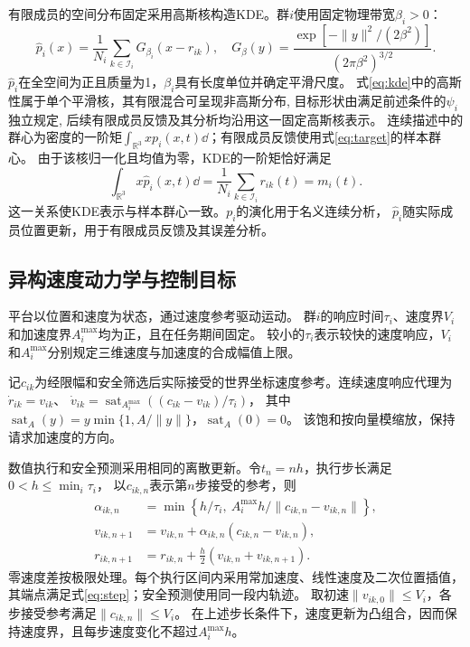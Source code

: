 \documentclass[UTF8,a4paper,11pt,fontset=none]{ctexart}
\newcommand{\R}{\mathbb R}\newcommand{\KL}{\operatorname{KL}}
\begin{document}
有限成员的空间分布固定采用高斯核构造KDE。群$i$使用固定物理带宽$\beta_i>0$：
\begin{equation}
\widehat p_i(x)=\frac1{N_i}\sum_{k\in\mathcal I_i}G_{\beta_i}(x-r_{ik}),\quad
G_\beta(y)=\frac{\exp[-\|y\|^2/(2\beta^2)]}{(2\pi\beta^2)^{3/2}}.
\label{eq:kde}
\end{equation}
$\widehat p_i$在全空间为正且质量为1，$\beta_i$具有长度单位并确定平滑尺度。
式\eqref{eq:kde}中的高斯性属于单个平滑核，其有限混合可呈现非高斯分布,
目标形状由满足前述条件的$\psi_i$独立规定,
后续有限成员反馈及其分析均沿用这一固定高斯核表示。
连续描述中的群心为密度的一阶矩$\int_{\R^3}xp_i(x,t)\dd$；有限成员反馈使用式\eqref{eq:target}的样本群心。
由于该核归一化且均值为零，KDE的一阶矩恰好满足
\[
\int_{\R^3}x\widehat p_i(x,t)\dd
=\frac1{N_i}\sum_{k\in\mathcal I_i}r_{ik}(t)=m_i(t).
\]
这一关系使KDE表示与样本群心一致。$p_i$的演化用于名义连续分析，
$\widehat p_i$随实际成员位置更新，用于有限成员反馈及其误差分析。

\subsection{异构速度动力学与控制目标}
平台以位置和速度为状态，通过速度参考驱动运动。
群$i$的响应时间$\tau_i$、速度界$V_i$和加速度界$A_i^{\max}$均为正，且在任务期间固定。
较小的$\tau_i$表示较快的速度响应，$V_i$和$A_i^{\max}$分别规定三维速度与加速度的合成幅值上限。

记$c_{ik}$为经限幅和安全筛选后实际接受的世界坐标速度参考。连续速度响应代理为
$\dot r_{ik}=v_{ik}$、
$\dot v_{ik}=\operatorname{sat}_{A_i^{\max}}((c_{ik}-v_{ik})/\tau_i)$，
其中$\operatorname{sat}_{A}(y)=y\min\{1,A/\|y\|\}$，$\operatorname{sat}_{A}(0)=0$。
该饱和按向量模缩放，保持请求加速度的方向。

数值执行和安全预测采用相同的离散更新。令$t_n=nh$，执行步长满足$0<h\le\min_i\tau_i$，
以$c_{ik,n}$表示第$n$步接受的参考，则
\begin{equation}
\begin{aligned}
\alpha_{ik,n}&=\min\left\{h/\tau_i,\ A_i^{\max}h/\|c_{ik,n}-v_{ik,n}\|\right\},\\
v_{ik,n+1}&=v_{ik,n}+\alpha_{ik,n}(c_{ik,n}-v_{ik,n}),\\
r_{ik,n+1}&=r_{ik,n}+\tfrac h2(v_{ik,n}+v_{ik,n+1}).
\end{aligned}
\label{eq:step}
\end{equation}
零速度差按极限处理。每个执行区间内采用常加速度、线性速度及二次位置插值，
其端点满足式\eqref{eq:step}；安全预测使用同一段内轨迹。
取初速$\|v_{ik,0}\|\le V_i$，各步接受参考满足$\|c_{ik,n}\|\le V_i$。
在上述步长条件下，速度更新为凸组合，因而保持速度界，且每步速度变化不超过$A_i^{\max}h$。
\end{document}

